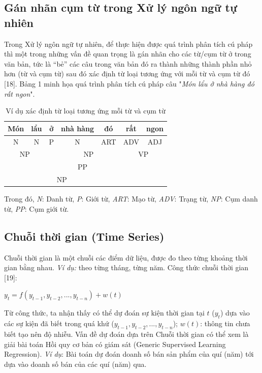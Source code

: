 \documentclass[12pt]{extarticle}
\begin{document}
		\subsection{Gán nhãn cụm từ trong Xử lý ngôn ngữ tự nhiên}
			\par Trong Xử lý ngôn ngữ tự nhiên, để thực hiện được quá trình phân tích cú pháp thì một trong những vấn đề quan trọng là gán nhãn cho các từ/cụm từ ở trong văn bản, tức là “bẻ” các câu trong văn bản đó ra thành những thành phần nhỏ hơn (từ và cụm từ) sau đó xác định từ loại tương ứng với mỗi từ và cụm từ đó [18]. Bảng 1 minh họa quá trình phân tích cú pháp câu "\textit{Món lẩu ở nhà hàng đó rất ngon}".
			\begin{table}[h]
				\centering
				\caption{Ví dụ xác định từ loại tương ứng mỗi từ và cụm từ}
				\label{my-label}
				\begin{tabular}{|c|c|c|c|c|c|c|}
				\hline
           				Món &   lẩu        &  ở &  nhà hàng          &  đó          &       rất     & ngon           \\ \hline
          					N & N          & P  &    N       &       ART    &     ADV      &     ADJ      \\ \hline
				\multicolumn{2}{|c|}{NP} &  & \multicolumn{2}{c|}{NP} &  \multicolumn{2}{c|}{VP} \\ \hline
				\multicolumn{2}{|c|}{} & \multicolumn{3}{c|}{PP}    &           &           \\ \hline
				\multicolumn{5}{|c|}{NP}                          &           &           \\ \hline
				\end{tabular}
			\end{table}
			\par Trong đó, \textit{N}: Danh từ,  \textit{P}: Giới từ,  \textit{ART}: Mạo từ,  \textit{ADV}: Trạng từ,  \textit{NP}: Cụm danh từ,  \textit{PP}: Cụm giới từ.
		\subsection{Chuỗi thời gian (Time Series)}
			\par Chuỗi thời gian là một chuỗi các điểm dữ liệu, được đo theo từng khoảng thời gian bằng nhau. \textit{Ví dụ:} theo từng tháng, từng năm. Công thức chuỗi thời gian [19]:
			\begin{center}
				$y_{t}=f(y_{t-1},y_{t-2},...,y_{t-n}) + w(t)$
			\end{center}
			\par Từ công thức, ta nhận thấy có thể dự đoán sự kiện thời gian tại $t$ ($y_{t}$) dựa vào các sự kiện đã biết trong quá khứ ($y_{t-1},y_{t-2},...,y_{t-n}$); $w(t)$: thông tin chưa biết tạo nên độ nhiễu. Vấn đề dự đoán dựa trên Chuỗi thời gian có thể xem là giải bài toán Hồi quy cơ bản có giám sát (Generic Supervised Learning Regression). \textit{Ví dụ}: Bài toán dự đoán doanh số bán sản phẩm của quí (năm) tới dựa vào doanh số bán của các quí (năm) qua.
\end{document}
